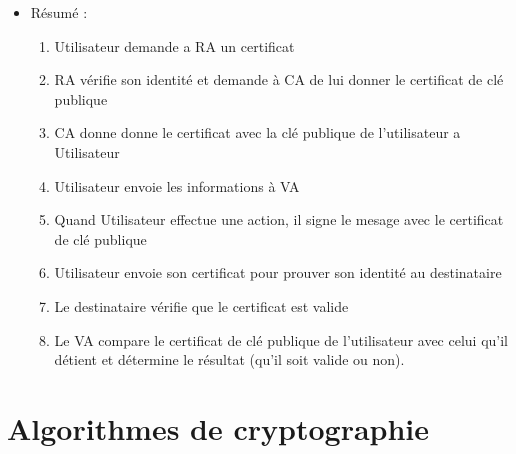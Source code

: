 \documentclass[a4paper]{article}
\begin{document}
\begin{itemize}[label=\textbullet, font=\Large]
\begin{itemize}[label=, font=\scriptsize]
    \end{itemize}
    \item Résumé :
    \begin{enumerate}
        \item Utilisateur demande a RA un certificat
        \item RA vérifie son identité et demande à CA de lui donner le certificat de clé publique
        \item CA donne donne le certificat avec la clé publique de l'utilisateur a Utilisateur
        \item Utilisateur envoie les informations à VA
        \item Quand Utilisateur effectue une action, il signe le mesage avec le certificat de clé publique
        \item Utilisateur envoie son certificat pour prouver son identité au destinataire
        \item Le destinataire vérifie que le certificat est valide
        \item Le VA compare le certificat de clé publique de l'utilisateur avec celui qu’il détient et détermine le résultat (qu'il soit valide ou non).
    \end{enumerate}
\end{itemize}

\section{Algorithmes de cryptographie}
\end{document}
